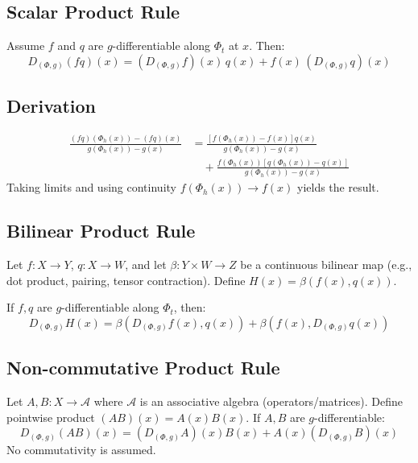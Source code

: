 \documentclass[12pt, oneside]{article}
\begin{document}
\subsection{Scalar Product Rule}

Assume $f$ and $q$ are $g$-differentiable along $\Phi_t$ at $x$. Then:
\begin{equation}
D_{(\Phi,g)}(fq)(x) = (D_{(\Phi,g)} f)(x)\, q(x) + f(x)\, (D_{(\Phi,g)} q)(x)
\end{equation}

\subsection{Derivation}

\begin{align}
\frac{(fq)(\Phi_h(x)) - (fq)(x)}{g(\Phi_h(x)) - g(x)} &= \frac{[f(\Phi_h(x)) - f(x)]q(x)}{g(\Phi_h(x)) - g(x)} \\
&\quad + \frac{f(\Phi_h(x))[q(\Phi_h(x)) - q(x)]}{g(\Phi_h(x)) - g(x)}
\end{align}
Taking limits and using continuity $f(\Phi_h(x)) \to f(x)$ yields the result.

\subsection{Bilinear Product Rule}

Let $f: X \rightarrow Y$, $q: X \rightarrow W$, and let $\beta: Y \times W \rightarrow Z$ be a continuous bilinear map (e.g., dot product, pairing, tensor contraction). Define $H(x) = \beta(f(x), q(x))$.

If $f, q$ are $g$-differentiable along $\Phi_t$, then:
\begin{equation}
D_{(\Phi,g)} H(x) = \beta(D_{(\Phi,g)} f(x), q(x)) + \beta(f(x), D_{(\Phi,g)} q(x))
\end{equation}

\subsection{Non-commutative Product Rule}

Let $A, B: X \rightarrow \mathcal{A}$ where $\mathcal{A}$ is an associative algebra (operators/matrices). Define pointwise product $(AB)(x) = A(x)B(x)$. If $A, B$ are $g$-differentiable:
\begin{equation}
D_{(\Phi,g)}(AB)(x) = (D_{(\Phi,g)} A)(x) B(x) + A(x) (D_{(\Phi,g)} B)(x)
\end{equation}
No commutativity is assumed.
\end{document}
